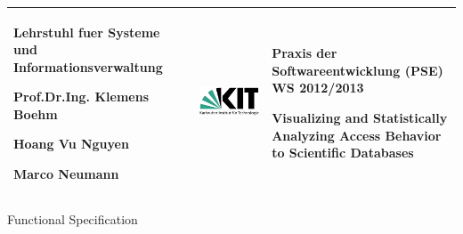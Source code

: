 \begin{titlepage}

\vspace*{-3cm}
\begin{center}

\begin{tabular}{m{5.5cm} m{5cm} m{5.5cm}}
\arrayrulecolor{Bittersweet!90}

\begin{center}
\footnotesize{
\textbf{ Lehrstuhl fuer Systeme und Informationsverwaltung}
\newline

Prof.Dr.Ing. Klemens Boehm

Hoang Vu Nguyen

Marco Neumann
} 	
\end{center}
   & 
\begin{center}

   \includegraphics[width=0.9\linewidth]{Pictures/KIT-Logo.png}
   
\end{center}   
   & 
\begin{center}
\footnotesize{
\textbf{Praxis der Softwareentwicklung (PSE)}\newline
WS 2012/2013\newline

Visualizing and Statistically Analyzing Access Behavior to Scientific Databases
}
\end{center}\\
\hline
 
\end{tabular}


\vspace*{5cm}

\Huge
Functional Specification

\vspace*{1.5cm}

\normalsize

\begin{center}


\end{center}
\end{center}
\end{titlepage}
